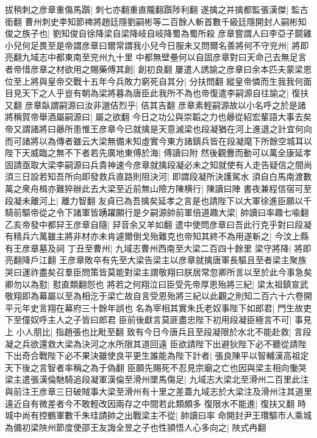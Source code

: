 拔稍刺之彦章重傷馬躓|{
	刺七亦翻重直隴翻躓陟利翻}
遂擒之并擒都監張漢傑|{
	監古銜翻}
曹州刺史李知節禆將趙廷隱劉嗣彬等二百餘人斬首數千級廷隱開封人嗣彬知俊之族子也|{
	劉知俊自徐降梁自梁降岐自岐降蜀為蜀所殺}
彦章嘗謂人曰李亞子鬬雞小兒何足畏至是帝謂彦章曰爾常謂我小兒今日服未又問爾名善將何不守兖州|{
	將即亮翻九域志中都東南至兖州九十里}
中都無壁壘何以自固彦章對曰天命己去無足言者帝惜彦章之材欲用之賜藥傅其創|{
	創初良翻}
屢遣人誘諭之彦章曰余本匹夫蒙梁恩位至上將與皇帝交戰十五年今兵敗力窮死自其分|{
	分扶問翻}
縱皇帝憐而生我我何面目見天下之人乎豈有朝為梁將暮為唐臣此我所不為也帝復遣李嗣源自往諭之|{
	復扶又翻}
彦章臥謂嗣源曰汝非邈佶烈乎|{
	佶其吉翻}
彦章素輕嗣源故以小名呼之於是諸將稱賀帝舉酒屬嗣源曰|{
	屬之欲翻}
今日之功公與崇韜之力也曏從紹宏輩語大事去矣帝又謂諸將曰曏所患惟王彦章今已就擒是天意滅梁也段凝猶在河上進退之計宜何向而可諸將以為傳者雖云大梁無備未知虛實今東方諸鎮兵皆在段凝麾下所餘空城耳以陛下天威臨之無不下者若先廣地東傅於海|{
	傅讀曰附}
然後觀釁而動可以萬全康延孝固請亟取大梁李嗣源曰兵貴神速今彦章就擒段凝必未之知就使有人走告疑信之間尚須三日設若知吾所向即發救兵直路則阻決河|{
	即謂段凝所決護駕水}
須自白馬南渡數萬之衆舟楫亦難猝辦此去大梁至近前無山險方陳横行|{
	陳讀曰陣}
書夜兼程信宿可至段凝未離河上|{
	離力智翻}
友貞已為吾擒矣延孝之言是也請陛下以大軍徐進臣願以千騎前驅帝從之令下諸軍皆踴躍願行是夕嗣源帥前軍倍道趣大梁|{
	帥讀曰率趣七喩翻}
乙亥帝發中都舁王彦章自隨|{
	舁音余又羊如翻}
遣中使問彦章曰吾此行克乎對曰段凝有精兵六萬雖主將非材亦未肯遽爾倒戈殆難克也帝知其終不為用遂斬之|{
	今汶上縣有王彦章墓及祠}
丁丑至曹州|{
	九域志曹州西南至大梁二百四十餘里}
梁守將降|{
	將即亮翻降戶江翻}
王彦章敗卒有先至大梁告梁主以彦章就擒唐軍長驅且至者梁主聚族哭曰運祚盡矣召羣臣問策皆莫能對梁主謂敬翔曰朕居常忽卿所言以至於此今事急矣卿勿以為懟|{
	懟直類翻怨也}
將若之何翔泣曰臣受先帝厚恩殆將三紀|{
	梁太祖鎮宣武敬翔即為幕屬以至為相汔于梁亡故自言受恩殆將三紀以此觀之則知二百六十六卷開平元年史言翔在幕府三十餘年誤也}
名為宰相其實朱氏老奴事陛下如郎君|{
	門生故吏下至僮奴呼主人之子皆曰郎君}
臣前後獻言莫匪盡忠陛下初用段凝臣極言不可|{
	事見上}
小人朋比|{
	指趙張也比毗至翻}
致有今日今唐兵且至段凝限於水北不能赴救|{
	言段凝之兵欲還救大梁為決河之水所限其道回遠}
臣欲請陛下出避狄陛下必不聽從請陛下出奇合戰陛下必不果決雖使良平更生誰能為陛下計者|{
	張良陳平以智輔漢高祖定天下後之言智者率稱之為于偽翻}
臣願先賜死不忍見宗廟之亡也因與梁主相向慟哭梁主遣張漢倫馳騎追段凝軍漢倫至滑州墜馬傷足|{
	九域志大梁北至滑州二百里此注與前注王彦章三日破賊事大梁至滑州有十里之差蓋九域志於大梁注及滑州注其道里遠近自有微差者今不敢輕改因兩存之中間若此類頗多}
復限水不能進|{
	復扶又翻}
時城中尚有控鶴軍數千朱珪請帥之出戰梁主不從|{
	帥讀曰率}
命開封尹王瓚驅市人乘城為備初梁陜州節度使邵王友誨全昱之子也性頴悟人心多向之|{
	陜式冉翻}
